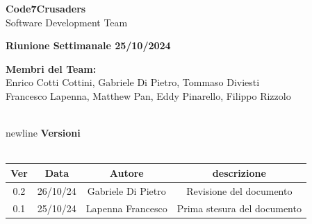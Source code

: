 \documentclass{article}
\begin{document}
\begin{titlepage}
    {\Huge \textbf{Code7Crusaders}}\\
    \vspace{0.5cm}
    {\Large Software Development Team}\\
    \vspace{2cm}
    
    {\large \textbf{Riunione Settimanale 25/10/2024}}\\
    \vspace{5cm}

    \textbf{Membri del Team:}\\
    Enrico Cotti Cottini, Gabriele Di Pietro, Tommaso Diviesti \\
    Francesco Lapenna, Matthew Pan, Eddy Pinarello, Filippo Rizzolo \\
    \vspace{0.5cm}
    
    \vspace{1cm}
\end{titlepage}

\begin{center}
    \\newline
    \textbf{Versioni}
    \\
    \\
    \begin{tabular}{|c|c|c|c|}
        \hline
        \textbf{Ver} & \textbf{Data} & \textbf{Autore} & \textbf{descrizione}\\
        \hline
        0.2 & 26/10/24 & Gabriele Di Pietro & Revisione del documento \\
        0.1 & 25/10/24 & Lapenna Francesco & Prima stesura del documento \\ 
        \hline
    \end{tabular}
\end{center}

\newpage
\tableofcontents

\newpage
\end{document}
